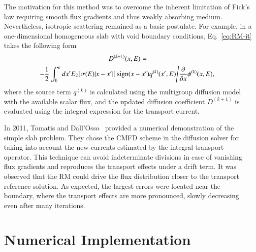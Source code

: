 The motivation for this method was to overcome the inherent limitation of Fick's law requiring smooth flux gradients and thus weakly absorbing medium. Nevertheless, isotropic scattering remained as a basic postulate. For example, in a one-dimensional homogeneous slab with void boundary conditions, Eq.~\eqref{eq:RM-it} takes the following form~\cite{Ronen-2004}
\begin{equation}
  \label{eq:RM-it-1D-slab}
  \begin{gathered}
  D^{(k+1)}(x,E) =\\ \left. -\frac{1}{2} \int_0^a dx'
    {E_2[\sigma(E) \lvert x-x' \rvert]\operatorname{sign}(x-x')q^{(k)}(x',E)}
    \middle/ \frac{\partial}{\partial x}\phi^{(k)}(x,E),\right.
  \end{gathered}
\end{equation}
where the source term $q^{(k)}$ is calculated using the multigroup diffusion model with the available scalar flux, and the updated diffusion coefficient $D^{(k+1)}$ is evaluated using the integral expression for the transport current.

In 2011, Tomatis and Dall'Osso~\cite{Tomatis-2011} provided a numerical demonstration of the simple slab problem. They chose the CMFD scheme in the diffusion solver for taking into account the new currents estimated by the integral transport operator.
%
%
This technique can avoid indeterminate divisions in case of vanishing flux gradients and reproduces the transport effects under a drift term. It was observed that the RM could drive the flux distribution closer to the transport reference solution. As expected, the largest errors were located near the boundary, where the transport effects are more pronounced, slowly decreasing even after many iterations.%


\section{Numerical Implementation}
\label{sec:RM-num}

